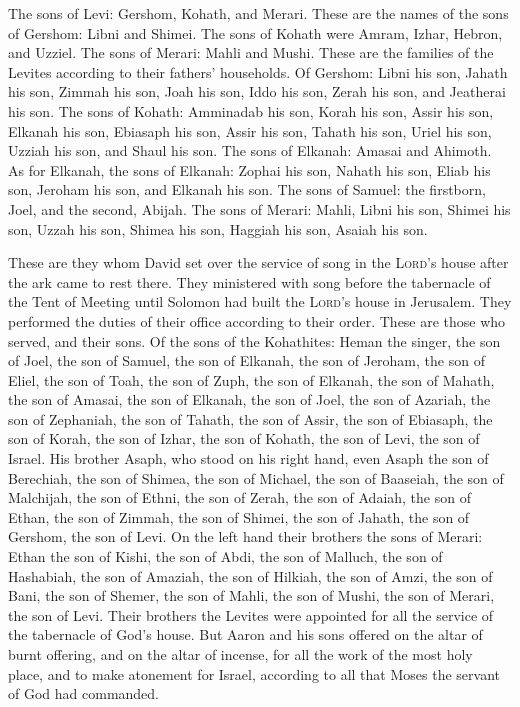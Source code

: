  The sons of Levi: Gershom, Kohath, and Merari.
 These are the names of the sons of Gershom: Libni and
Shimei.  The sons of Kohath were Amram, Izhar, Hebron,
and Uzziel.  The sons of Merari: Mahli and Mushi. These
are the families of the Levites according to their fathers' households.
 Of Gershom: Libni his son, Jahath his son, Zimmah his
son,  Joah his son, Iddo his son, Zerah his son, and
Jeatherai his son.  The sons of Kohath: Amminadab his
son, Korah his son, Assir his son,  Elkanah his son,
Ebiasaph his son, Assir his son,  Tahath his son, Uriel
his son, Uzziah his son, and Shaul his son.  The sons of
Elkanah: Amasai and Ahimoth.  As for Elkanah, the sons of
Elkanah: Zophai his son, Nahath his son,  Eliab his son,
Jeroham his son, and Elkanah his son.  The sons of
Samuel: the firstborn, Joel, and the second, Abijah.  The
sons of Merari: Mahli, Libni his son, Shimei his son, Uzzah his son,
 Shimea his son, Haggiah his son, Asaiah his son.

 These are they whom David set over the service of song
in the \textsc{Lord}'s house after the ark came to rest there.
 They ministered with song before the tabernacle of the
Tent of Meeting until Solomon had built the \textsc{Lord}'s house in
Jerusalem. They performed the duties of their office according to their
order.  These are those who served, and their sons. Of
the sons of the Kohathites: Heman the singer, the son of Joel, the son
of Samuel,  the son of Elkanah, the son of Jeroham, the
son of Eliel, the son of Toah,  the son of Zuph, the son
of Elkanah, the son of Mahath, the son of Amasai,  the
son of Elkanah, the son of Joel, the son of Azariah, the son of
Zephaniah,  the son of Tahath, the son of Assir, the son
of Ebiasaph, the son of Korah,  the son of Izhar, the son
of Kohath, the son of Levi, the son of Israel.  His
brother Asaph, who stood on his right hand, even Asaph the son of
Berechiah, the son of Shimea,  the son of Michael, the
son of Baaseiah, the son of Malchijah,  the son of Ethni,
the son of Zerah, the son of Adaiah,  the son of Ethan,
the son of Zimmah, the son of Shimei,  the son of Jahath,
the son of Gershom, the son of Levi.  On the left hand
their brothers the sons of Merari: Ethan the son of Kishi, the son of
Abdi, the son of Malluch,  the son of Hashabiah, the son
of Amaziah, the son of Hilkiah,  the son of Amzi, the son
of Bani, the son of Shemer,  the son of Mahli, the son of
Mushi, the son of Merari, the son of Levi.  Their
brothers the Levites were appointed for all the service of the
tabernacle of God's house.  But Aaron and his sons
offered on the altar of burnt offering, and on the altar of incense, for
all the work of the most holy place, and to make atonement for Israel,
according to all that Moses the servant of God had commanded.

